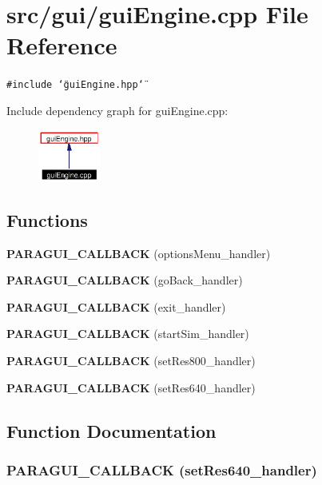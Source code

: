 \section{src/gui/gui\-Engine.cpp File Reference}
\label{guiEngine_8cpp}
{\tt \#include \char`\"{}gui\-Engine.hpp\char`\"{}}\par


Include dependency graph for gui\-Engine.cpp:\begin{figure}[H]
\begin{center}
\leavevmode
\includegraphics[width=58pt]{guiEngine_8cpp__incl}
\end{center}
\end{figure}
\subsection*{Functions}
\begin{CompactItemize}
\item 
{\bf PARAGUI\_\-CALLBACK} (options\-Menu\_\-handler)
\item 
{\bf PARAGUI\_\-CALLBACK} (go\-Back\_\-handler)
\item 
{\bf PARAGUI\_\-CALLBACK} (exit\_\-handler)
\item 
{\bf PARAGUI\_\-CALLBACK} (start\-Sim\_\-handler)
\item 
{\bf PARAGUI\_\-CALLBACK} (set\-Res800\_\-handler)
\item 
{\bf PARAGUI\_\-CALLBACK} (set\-Res640\_\-handler)
\end{CompactItemize}


\subsection{Function Documentation}
\subsubsection{\setlength{\rightskip}{0pt plus 5cm}PARAGUI\_\-CALLBACK (set\-Res640\_\-handler)}\label{guiEngine_8cpp_a5}


